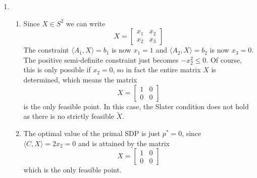 \documentclass[11pt]{amsart}
\begin{document}
\begin{enumerate}
\begin{enumerate}
\end{enumerate}



\vspace{0.5in}


\item \begin{enumerate}

\item Since $X \in S^2$ we can write
\[
X = \begin{bmatrix} x_1 & x_2\\ x_2 & x_3 \end{bmatrix}
\]
The constraint $\langle A_1, X\rangle = b_1$ is now $x_1 = 1$ and $\langle A_2,X \rangle = b_2$ is now $x_3 = 0$.  The positive semi-definite constraint just becomes $-x_2^2 \le 0$.  Of course, this is only possible if $x_2 = 0$, so in fact the entire matrix $X$ is determined, which means the matrix
\[
X = \begin{bmatrix} 1&0\\0&0 \end{bmatrix}
\]
is the only feasible point.  In this case, the Slater condition does not hold as there is no strictly feasible $\tilde{X}$.



\item The optimal value of the primal SDP is just $p^* = 0$, since $\langle C,X\rangle = 2x_2 = 0$ and is attained by the matrix 
\[
X = \begin{bmatrix} 1&0\\0&0 \end{bmatrix}
\]
which is the only feasible point.





\end{enumerate}
\end{enumerate}
\end{document}
